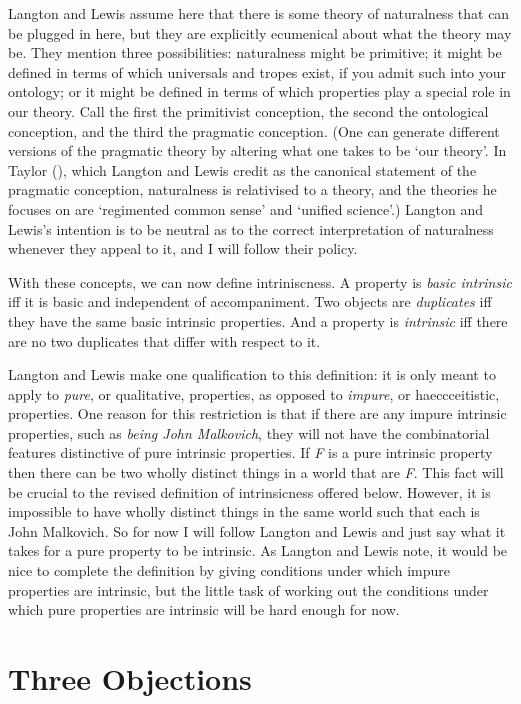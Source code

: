 \documentclass[
  10pt,
  letterpaper,
  DIV=11,
  numbers=noendperiod,
  twoside]{scrartcl}
\begin{document}
Langton and Lewis assume here that there is some theory of naturalness
that can be plugged in here, but they are explicitly ecumenical about
what the theory may be. They mention three possibilities: naturalness
might be primitive; it might be defined in terms of which universals and
tropes exist, if you admit such into your ontology; or it might be
defined in terms of which properties play a special role in our theory.
Call the first the primitivist conception, the second the ontological
conception, and the third the pragmatic conception. (One can generate
different versions of the pragmatic theory by altering what one takes to
be `our theory'. In Taylor (), which
Langton and Lewis credit as the canonical statement of the pragmatic
conception, naturalness is relativised to a theory, and the theories he
focuses on are `regimented common sense' and `unified science'.) Langton
and Lewis's intention is to be neutral as to the correct interpretation
of naturalness whenever they appeal to it, and I will follow their
policy.

With these concepts, we can now define intriniscness. A property is
\emph{basic intrinsic} iff it is basic and independent of accompaniment.
Two objects are \emph{duplicates} iff they have the same basic intrinsic
properties. And a property is \emph{intrinsic} iff there are no two
duplicates that differ with respect to it.

Langton and Lewis make one qualification to this definition: it is only
meant to apply to \emph{pure}, or qualitative, properties, as opposed to
\emph{impure}, or haeccceitistic, properties. One reason for this
restriction is that if there are any impure intrinsic properties, such
as \emph{being John Malkovich}, they will not have the combinatorial
features distinctive of pure intrinsic properties. If \emph{F} is a pure
intrinsic property then there can be two wholly distinct things in a
world that are \emph{F}. This fact will be crucial to the revised
definition of intrinsicness offered below. However, it is impossible to
have wholly distinct things in the same world such that each is John
Malkovich. So for now I will follow Langton and Lewis and just say what
it takes for a pure property to be intrinsic. As Langton and Lewis note,
it would be nice to complete the definition by giving conditions under
which impure properties are intrinsic, but the little task of working
out the conditions under which pure properties are intrinsic will be
hard enough for now.

\section{Three Objections}\label{three-objections}
\end{document}
